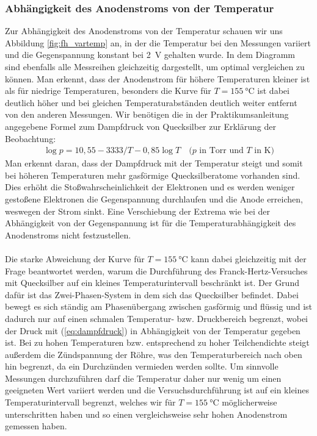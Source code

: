 \documentclass[11pt, a4paper]{article}
\begin{document}
\subsubsection{Abhängigkeit des Anodenstroms von der Temperatur}
Zur Abhängigkeit des Anodenstroms von der Temperatur schauen wir uns Abbildung \ref{fig:fh_vartemp} an, in der die Temperatur bei den Messungen variiert und die Gegenspannung konstant bei \SI{2}{\volt} gehalten wurde.
In dem Diagramm sind ebenfalls alle Messreihen gleichzeitig dargestellt, um optimal vergleichen zu können.
Man erkennt, dass der Anodenstrom für höhere Temperaturen kleiner ist als für niedrige Temperaturen, besonders die Kurve für $T=\SI{155}{\degreeCelsius}$ ist dabei deutlich höher und bei gleichen Temperaturabständen deutlich weiter entfernt von den anderen Messungen.
Wir benötigen die in der Praktikumsanleitung angegebene Formel zum Dampfdruck von Quecksilber zur Erklärung der Beobachtung:
\begin{align}
\log p = 10,55-3333/T-0,85\log T \quad \text{($p$ in Torr und $T$ in K)}
\label{eq:dampfdruck}
\end{align}
Man erkennt daran, dass der Dampfdruck mit der Temperatur steigt und somit bei höheren Temperaturen mehr gasförmige Quecksilberatome vorhanden sind.
Dies erhöht die Stoßwahrscheinlichkeit der Elektronen und es werden weniger gestoßene Elektronen die Gegenspannung durchlaufen und die Anode erreichen, weswegen der Strom sinkt.
Eine Verschiebung der Extrema wie bei der Abhängigkeit von der Gegenspannung ist für die Temperaturabhängigkeit des Anodenstroms nicht festzustellen.
\\
\\
Die starke Abweichung der Kurve für $T=\SI{155}{\degreeCelsius}$ kann dabei gleichzeitig mit der Frage beantwortet werden, warum die Durchführung des Franck-Hertz-Versuches mit Quecksilber auf ein kleines Temperaturintervall beschränkt ist.
Der Grund dafür ist das Zwei-Phasen-System in dem sich das Quecksilber befindet.
Dabei bewegt es sich ständig am Phasenübergang zwischen gasförmig und flüssig und ist dadurch nur auf einen schmalen Temperatur- bzw. Druckbereich begrenzt, wobei der Druck mit (\ref{eq:dampfdruck}) in Abhängigkeit von der Temperatur gegeben ist.
Bei zu hohen Temperaturen bzw. entsprechend zu hoher Teilchendichte steigt außerdem die Zündspannung der Röhre, was den Temperaturbereich nach oben hin begrenzt, da ein Durchzünden vermieden werden sollte. 
Um sinnvolle Messungen durchzuführen darf die Temperatur daher nur wenig um einen geeigneten Wert variiert werden und die Versuchsdurchführung ist auf ein kleines Temperaturintervall begrenzt, welches wir für $T=\SI{155}{\degreeCelsius}$ möglicherweise unterschritten haben und so einen vergleichsweise sehr hohen Anodenstrom gemessen haben.
\end{document}
